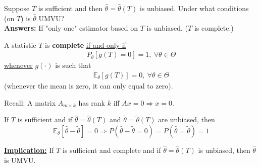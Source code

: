 \documentclass[11pt]{elegantbook}
\begin{document}
\begin{remark}
    Suppose $T$ is sufficient and then $\hat{\theta}=\hat{\theta}(T)$ is unbiased. Under what conditions (on $T$) is $\hat{\theta}$ UMVU?\\
    \textbf{Answers:} If "only one" estimator based on $T$ is unbiased. ($T$ is complete.)
\end{remark}

\begin{definition}
    \normalfont
    A statistic $T$ is \textbf{complete} \underline{if and only if}
    \begin{equation}
        \begin{aligned}
            P_\theta[g(T)=0]=1, \ \forall \theta\in \Theta
        \end{aligned}
        \nonumber
    \end{equation}
    \underline{whenever} $g(\cdot)$ is such that
    \begin{equation}
        \begin{aligned}
            \mathbb{E}_\theta[g(T)]=0,\ \forall \theta\in \Theta
        \end{aligned}
        \nonumber
    \end{equation}
    (whenever the mean is zero, it can only equal to zero).
\end{definition}

Recall: A matrix $A_{m\times k}$ has rank $k$ iff $Ax=0 \Rightarrow x=0$.

\begin{theorem}
    If $T$ is sufficient and if $\hat{\theta}=\hat{\theta}(T)$ and $\tilde{\theta}=\tilde{\theta}(T)$ are unbiased, then $$\mathbb{E}_\theta[\hat{\theta}-\tilde{\theta}]=0 \Rightarrow P(\hat{\theta}-\tilde{\theta}=0)=P(\hat{\theta}=\tilde{\theta})=1$$
\end{theorem}

\textbf{\underline{Implication:}}
If $T$ is sufficient and complete and if $\hat{\theta}=\hat{\theta}(T)$ is unbiased, then $\hat{\theta}$ is UMVU.
\end{document}
